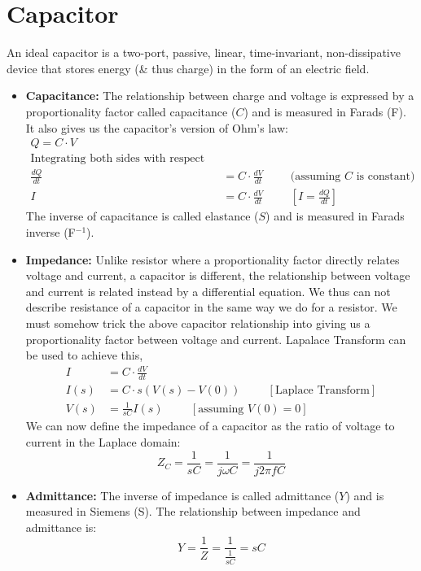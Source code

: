 \section{Capacitor}
An ideal capacitor is a two-port, passive, linear, time-invariant,
non-dissipative device that stores energy (\& thus charge) in the
form of an electric field.

\begin{itemize}
  \item \textbf{Capacitance:}
    The relationship between charge and
    voltage is expressed by a proportionality factor called capacitance
    (\(C\)) and is measured in Farads (F). It also gives us the
    capacitor's version of Ohm's law:
    \begin{align*}
      Q = C \cdot V \\
      \text{Integrating both sides with respect to time:} \\
      \frac{dQ}{dt} &= C \cdot \frac{dV}{dt} \hspace{1cm} \text{(assuming \(C\) is constant)} \\
      I &= C \cdot \frac{dV}{dt} \hspace{1cm} [I = \frac{dQ}{dt}]
    \end{align*}
    The inverse of capacitance is called elastance (\(S\)) and is measured in Farads
    inverse (F\(^{-1}\)).
  \item \textbf{Impedance:}
    Unlike resistor where a proportionality factor directly relates
    voltage and current, a capacitor is different, the relationship
    between voltage and current is related instead by a differential
    equation. We thus can not describe resistance of a capacitor in the
    same way we do for a resistor. We must somehow trick the above
    capacitor relationship into giving us a proportionality factor
    between voltage and current. Lapalace Transform can be used to
    achieve this,
    \begin{align*}
      I &= C \cdot \frac{dV}{dt} \\
      I(s) &= C \cdot s (V(s) - V(0)) \hspace{1cm} [\text{Laplace Transform}] \\
      V(s) &= \frac{1}{sC} I(s) \hspace{1cm} [\text{assuming \(V(0) = 0\)}]
    \end{align*}
    We can now define the impedance of a capacitor as the ratio
    of voltage to current in the Laplace domain:
    \[
      Z_C = \frac{1}{s C} = \frac{1}{j\omega C} = \frac{1}{j 2 \pi f C}
    \]
  \item \textbf{Admittance:}
    The inverse of impedance is called admittance (\(Y\)) and
    is measured in Siemens (S). The relationship between impedance
    and admittance is:
    \[
      Y = \frac{1}{Z} = \frac{1}{\frac{1}{sC}} = sC
    \]


\end{itemize}
